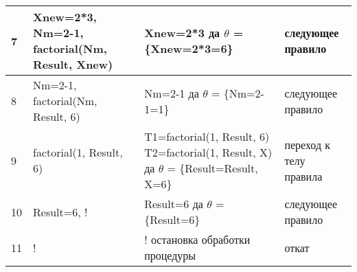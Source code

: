 \begin{table}[!h]
\begin{center}
\begin{threeparttable}
\begin{tabular}{|m{0.5cm}|m{3.5cm}|m{8.5cm}|m{3cm}|}
				\hline
				7 & Xnew=2*3, \newline Nm=2-1, \newline factorial(Nm, Result, Xnew) & Xnew=2*3 \newline да \newline $\theta$ = \{Xnew=2*3=6\} & следующее правило \\
				\hline
				8 & Nm=2-1, \newline factorial(Nm, Result, 6) & Nm=2-1 \newline да \newline $\theta$ = \{Nm=2-1=1\} & следующее правило \\
				\hline
				9 & factorial(1, Result, 6) & T1=factorial(1, Result, 6) \newline T2=factorial(1, Result, X) \newline да \newline $\theta$ = \{Result=Result, X=6\} & переход к \newline телу правила \\
				\hline
				10 & Result=6, ! & Result=6 \newline да \newline $\theta$ = \{Result=6\} & следующее правило \\
				\hline
				11 & ! & ! \newline остановка обработки процедуры & откат \\
				\hline
			\end{tabular}
\end{threeparttable}
\end{center}
\end{table}				
				
